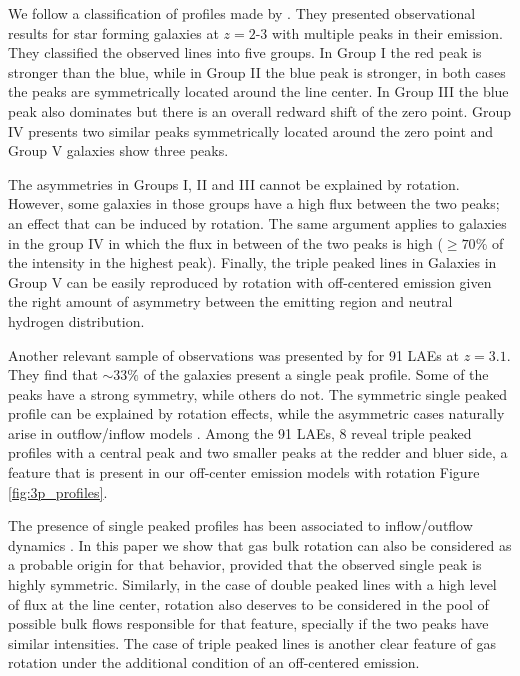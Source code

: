 \documentclass{emulateapj}
\newcommand{\ly}{{\ifmmode{{\rm Ly}\alpha~}\else{Ly$\alpha$~}\fi}}
\begin{document}
We follow a classification of \ly profiles made by
\cite{Kulas12}. They presented observational results for star forming
galaxies at $z=2$-$3$ with multiple peaks in their \ly emission.
They classified the observed lines into five groups. In Group I the
red peak is stronger than the blue, while in Group II the blue peak is
stronger, in both cases the peaks are symmetrically located around the
line center. In Group III the blue peak also dominates but there is an
overall redward shift of the zero point. Group IV presents two similar
peaks symmetrically located around the zero point and Group V galaxies show
three peaks. 

The asymmetries in Groups I, II  and III cannot be explained by
rotation. However, some galaxies in those groups have a high flux between
the two peaks; an effect that can be induced by rotation. The same
argument applies to galaxies in the group IV in which the flux
in between of the two peaks is high ($ \geq 70 \%$ of the intensity in
the highest peak). Finally, the triple peaked lines in Galaxies in
Group V can be easily reproduced by rotation with off-centered
emission given the right amount of asymmetry between the emitting
region and neutral hydrogen distribution. 

Another relevant sample of observations was presented by \cite{Yamada2012} 
for 91 LAEs at $z=3.1$. They find that $\sim 33 \%$ of the galaxies present 
a single peak profile. Some of the peaks have a strong symmetry, while
others do not. The symmetric single peaked profile can be explained by
rotation effects, while the asymmetric cases naturally arise in
outflow/inflow models \citep{Verhamme2008, Dijkstra06}. Among the 91
LAEs, 8 reveal triple peaked profiles with a central peak and two
smaller peaks at the redder and bluer side, a feature that is present
in our off-center emission models with rotation Figure \ref{fig:3p_profiles}. 

The presence of single peaked profiles has been associated to
inflow/outflow dynamics \citep{Verhamme06,DijkstraKramer}. In this
paper we show that gas bulk rotation can also be considered as a
probable origin for that behavior, provided that the observed single peak is highly
symmetric. Similarly, in the case of double peaked lines with a high
level of flux at the line center, rotation also deserves to be considered in
the pool of possible bulk flows responsible for that feature,
specially if the two peaks have similar intensities. The case of
triple peaked lines is another clear feature of gas rotation under the
additional condition of an off-centered emission. 
\end{document}
